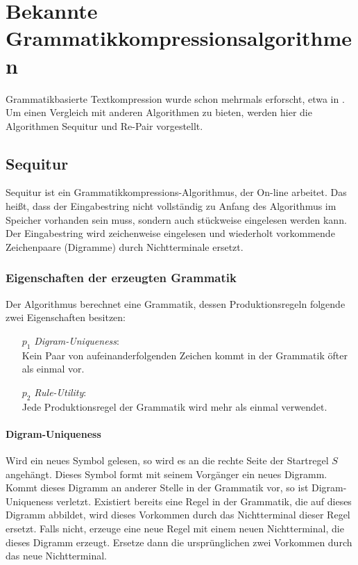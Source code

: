 \chapter{Bekannte Grammatikkompressionsalgorithmen}
\label{algorithmen}

Grammatikbasierte Textkompression wurde schon mehrmals erforscht, etwa in \cite{nevill-manning_identifying_1997, larsson_offline_1999, apostolico_off-line_2000}. Um einen Vergleich mit anderen Algorithmen zu bieten, werden hier die Algorithmen Sequitur \cite{nevill-manning_identifying_1997} und Re-Pair \cite{larsson_offline_1999} vorgestellt.

\section{Sequitur}
\label{sequitur}

Sequitur \cite{nevill-manning_identifying_1997} ist ein Grammatikkompressions-Algorithmus, der On-line arbeitet. Das heißt, dass der Eingabestring nicht vollständig zu Anfang des Algorithmus im Speicher vorhanden sein muss, sondern auch stückweise eingelesen werden kann. Der Eingabestring wird zeichenweise eingelesen und wiederholt vorkommende Zeichenpaare (Digramme) durch Nichtterminale ersetzt.

\subsection{Eigenschaften der erzeugten Grammatik}

Der Algorithmus berechnet eine Grammatik, dessen Produktionsregeln folgende zwei Eigenschaften besitzen:
\begin{enumerate}
	\item[$p_1$] \emph{Digram-Uniqueness}:\\
	Kein Paar von aufeinanderfolgenden Zeichen kommt in der Grammatik öfter als einmal vor.
	\item[$p_2$] \emph{Rule-Utility}:\\
	Jede Produktionsregel der Grammatik wird mehr als einmal verwendet.
\end{enumerate}

\subsubsection{Digram-Uniqueness}

Wird ein neues Symbol gelesen, so wird es an die rechte Seite der Startregel $S$ angehängt. Dieses Symbol formt mit seinem Vorgänger ein neues Digramm. Kommt dieses Digramm an anderer Stelle in der Grammatik vor, so ist Digram-Uniqueness verletzt. 
Existiert bereits eine Regel in der Grammatik, die auf dieses Digramm abbildet, wird dieses Vorkommen durch das Nichtterminal dieser Regel ersetzt. 
Falls nicht, erzeuge eine neue Regel mit einem neuen Nichtterminal, die dieses Digramm erzeugt. Ersetze dann die ursprünglichen zwei Vorkommen durch das neue Nichtterminal.

